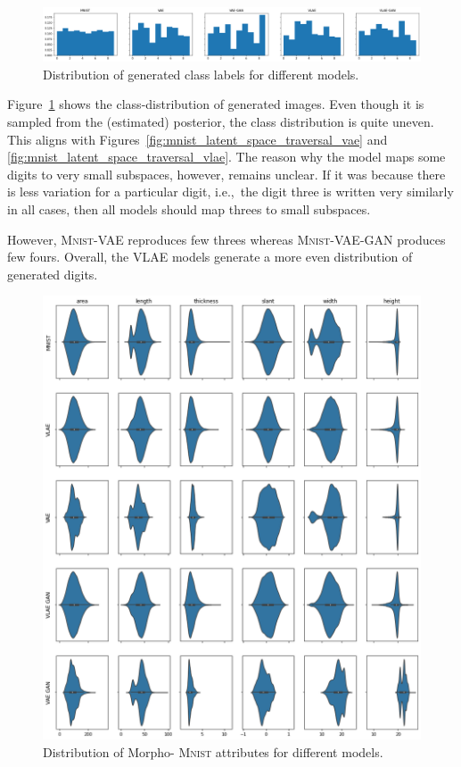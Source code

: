 \begin{figure}
    \centering
    \includegraphics[width=\textwidth]{images/generated_vs_true/mnist/class_distr.png}
    \caption{Distribution of generated class labels for different models.}
    \label{fig:generated_class_distribution}
\end{figure}

Figure~\ref{fig:generated_class_distribution} shows the class-distribution of generated images.
Even though it is sampled from the (estimated) posterior, the class distribution is quite uneven.
This aligns with Figures~\ref{fig:mnist_latent_space_traversal_vae} and \ref{fig:mnist_latent_space_traversal_vlae}.
The reason why the model maps some digits to very small subspaces, however, remains unclear.
If it was because there is less variation for a particular digit, i.e.,~the digit three is written very similarly in all cases, then all models should map threes to small subspaces.

However, \textsc{Mnist}-\ac{VAE} reproduces few threes whereas \textsc{Mnist}-\ac{VAE}-\ac{GAN} produces few fours.
Overall, the \ac{VLAE} models generate a more even distribution of generated digits.

\begin{figure}
    \centering
    \includegraphics[width=\textwidth]{images/generated_vs_true/mnist/morpho_distr.png}
    \caption{Distribution of Morpho- \textsc{Mnist} attributes for different models.}
    \label{fig:generated_morpho_distribution}
\end{figure}

